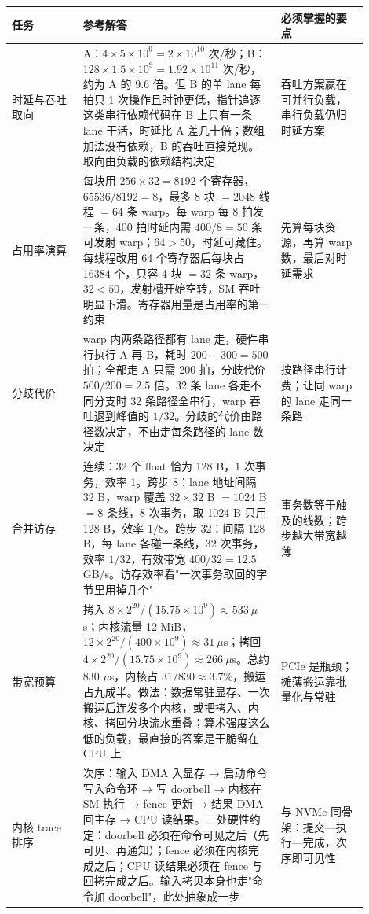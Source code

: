 \begin{longtable}{L{0.18\linewidth}L{0.5\linewidth}L{0.22\linewidth}}
\toprule
任务 & 参考解答 & 必须掌握的要点 \\
\midrule
时延与吞吐取向 & A：$4\times5\times10^{9}=2\times10^{10}$ 次/秒；B：$128\times1.5\times10^{9}=1.92\times10^{11}$ 次/秒，约为 A 的 9.6 倍。但 B 的单 lane 每拍只 1 次操作且时钟更低，指针追逐这类串行依赖代码在 B 上只有一条 lane 干活，时延比 A 差几十倍；数组加法没有依赖，B 的吞吐直接兑现。取向由负载的依赖结构决定 & 吞吐方案赢在可并行负载，串行负载仍归时延方案 \\
占用率演算 & 每块用 $256\times32=8192$ 个寄存器，$65536/8192=8$，最多 8 块 $=2048$ 线程 $=64$ 条 warp。每 warp 每 8 拍发一条，400 拍时延内需 $400/8=50$ 条可发射 warp；$64>50$，时延可藏住。每线程改用 64 个寄存器后每块占 16384 个，只容 4 块 $=32$ 条 warp，$32<50$，发射槽开始空转，SM 吞吐明显下滑。寄存器用量是占用率的第一约束 & 先算每块资源，再算 warp 数，最后对时延需求 \\
分歧代价 & warp 内两条路径都有 lane 走，硬件串行执行 A 再 B，耗时 $200+300=500$ 拍；全部走 A 只需 200 拍，分歧代价 $500/200=2.5$ 倍。32 条 lane 各走不同分支时 32 条路径全串行，warp 吞吐退到峰值的 $1/32$。分歧的代价由路径数决定，不由走每条路径的 lane 数决定 & 按路径串行计费；让同 warp 的 lane 走同一条路 \\
合并访存 & 连续：32 个 float 恰为 128 B，1 次事务，效率 1。跨步 8：lane 地址间隔 32 B，warp 覆盖 $32\times32$ B $=1024$ B $=8$ 条线，8 次事务，取 1024 B 只用 128 B，效率 $1/8$。跨步 32：间隔 128 B，每 lane 各碰一条线，32 次事务，效率 $1/32$，有效带宽 $400/32=12.5$ GB/s。访存效率看"一次事务取回的字节里用掉几个" & 事务数等于触及的线数；跨步越大带宽越薄 \\
带宽预算 & 拷入 $8\times2^{20}/(15.75\times10^{9})\approx533\ \mu$s；内核流量 12 MiB，$12\times2^{20}/(400\times10^{9})\approx31\ \mu$s；拷回 $4\times2^{20}/(15.75\times10^{9})\approx266\ \mu$s。总约 830 $\mu$s，内核占 $31/830\approx3.7\%$，搬运占九成半。做法：数据常驻显存、一次搬运后连发多个内核，或把拷入、内核、拷回分块流水重叠；算术强度这么低的负载，最直接的答案是干脆留在 CPU 上 & PCIe 是瓶颈；摊薄搬运靠批量化与常驻 \\
内核 trace 排序 & 次序：输入 DMA 入显存 → 启动命令写入命令环 → 写 doorbell → 内核在 SM 执行 → fence 更新 → 结果 DMA 回主存 → CPU 读结果。三处硬性约定：doorbell 必须在命令可见之后（先可见、再通知）；fence 必须在内核完成之后；CPU 读结果必须在 fence 与回拷完成之后。输入拷贝本身也走"命令加 doorbell"，此处抽象成一步 & 与 NVMe 同骨架：提交—执行—完成，次序即可见性 \\
\bottomrule
\end{longtable}
